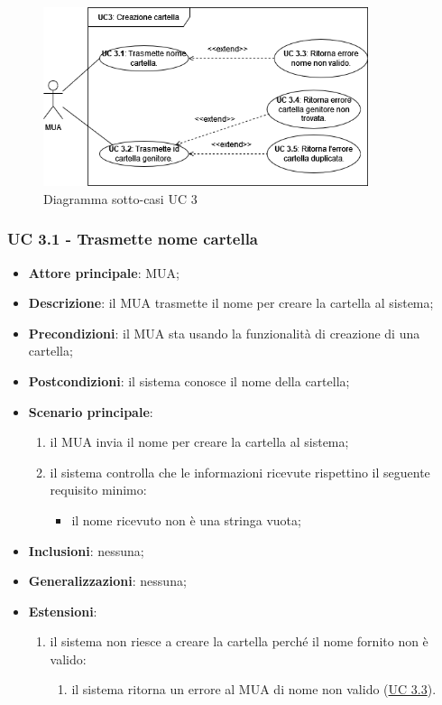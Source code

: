 \begin{figure}[H]
    \includegraphics[width=0.85\textwidth]{sections/uc_imgs/UC03.png}
    \centering
    \caption{Diagramma sotto-casi UC 3}
\end{figure}

\subsubsection{UC 3.1 - Trasmette nome cartella} \label{sec:UC3.1}
    \begin{itemize}
        \item \textbf{Attore principale}: MUA;
        \item \textbf{Descrizione}: il MUA trasmette il nome per creare la cartella al sistema;
        \item \textbf{Precondizioni}: il MUA sta usando la funzionalità di creazione di una cartella;
        \item \textbf{Postcondizioni}: il sistema conosce il nome della cartella;
        \item \textbf{Scenario principale}:
            \begin{enumerate}
                \item il MUA invia il nome per creare la cartella al sistema;
                \item il sistema controlla che le informazioni ricevute rispettino il seguente requisito minimo:
                \begin{itemize}
                    \item il nome ricevuto non è una stringa vuota;
                \end{itemize}
            \end{enumerate}
        \item \textbf{Inclusioni}: nessuna;
        \item \textbf{Generalizzazioni}: nessuna;
        \item \textbf{Estensioni}:
            \begin{enumerate}[label=\alph*.]
                \item il sistema non riesce a creare la cartella perché il nome fornito non è valido:
                \begin{enumerate}[label=\arabic*.]
                    \item il sistema ritorna un errore al MUA di nome non valido (\hyperref[sec:UC3.3]{UC 3.3}).
                \end{enumerate}
            \end{enumerate}
    \end{itemize}

